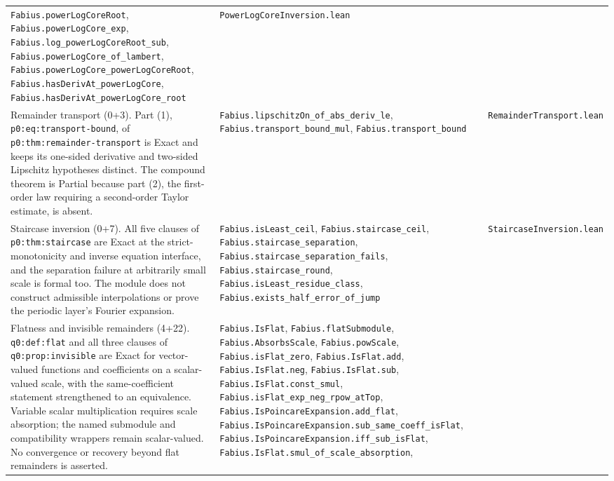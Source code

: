 \documentclass[11pt,oneside]{article}
\theoremstyle{definition}
\theoremstyle{remark}
\begin{document}
\begin{longtable}{@{}p{}p{}p{}@{}}
\nolinkurl{Fabius.powerLogCoreRoot},
\nolinkurl{Fabius.powerLogCore_exp},
\nolinkurl{Fabius.log_powerLogCoreRoot_sub},
\nolinkurl{Fabius.powerLogCore_of_lambert},
\nolinkurl{Fabius.powerLogCore_powerLogCoreRoot},
\nolinkurl{Fabius.hasDerivAt_powerLogCore},
\nolinkurl{Fabius.hasDerivAt_powerLogCore_root} &
\nolinkurl{PowerLogCoreInversion.lean} \\
Remainder transport (0+3).  Part (1),
\nolinkurl{p0:eq:transport-bound}, of
\nolinkurl{p0:thm:remainder-transport} is Exact and keeps its one-sided
derivative and two-sided Lipschitz hypotheses distinct.  The compound theorem
is Partial because part (2), the first-order law requiring a second-order
Taylor estimate, is absent. &
\nolinkurl{Fabius.lipschitzOn_of_abs_deriv_le},
\nolinkurl{Fabius.transport_bound_mul},
\nolinkurl{Fabius.transport_bound} &
\nolinkurl{RemainderTransport.lean} \\
Staircase inversion (0+7).  All five clauses of
\nolinkurl{p0:thm:staircase} are Exact at the strict-monotonicity and inverse
equation interface, and the separation failure at arbitrarily small scale is
formal too.  The module does not construct admissible interpolations or prove
the periodic layer's Fourier expansion. &
\nolinkurl{Fabius.isLeast_ceil}, \nolinkurl{Fabius.staircase_ceil},
\nolinkurl{Fabius.staircase_separation},
\nolinkurl{Fabius.staircase_separation_fails},
\nolinkurl{Fabius.staircase_round},
\nolinkurl{Fabius.isLeast_residue_class},
\nolinkurl{Fabius.exists_half_error_of_jump} &
\nolinkurl{StaircaseInversion.lean} \\
Flatness and invisible remainders (4+22).  \nolinkurl{q0:def:flat} and all
three clauses of \nolinkurl{q0:prop:invisible} are Exact for vector-valued
functions and coefficients on a scalar-valued scale, with the same-coefficient
statement strengthened to an equivalence.  Variable scalar multiplication
requires scale absorption; the named submodule and compatibility wrappers
remain scalar-valued.  No convergence or recovery beyond flat remainders is
asserted. &
\nolinkurl{Fabius.IsFlat}, \nolinkurl{Fabius.flatSubmodule},
\nolinkurl{Fabius.AbsorbsScale}, \nolinkurl{Fabius.powScale},
\nolinkurl{Fabius.isFlat_zero}, \nolinkurl{Fabius.IsFlat.add},
\nolinkurl{Fabius.IsFlat.neg}, \nolinkurl{Fabius.IsFlat.sub},
\nolinkurl{Fabius.IsFlat.const_smul},
\nolinkurl{Fabius.isFlat_exp_neg_rpow_atTop},
\nolinkurl{Fabius.IsPoincareExpansion.add_flat},
\nolinkurl{Fabius.IsPoincareExpansion.sub_same_coeff_isFlat},
\nolinkurl{Fabius.IsPoincareExpansion.iff_sub_isFlat},
\nolinkurl{Fabius.IsFlat.smul_of_scale_absorption},

\end{longtable}
\end{document}
